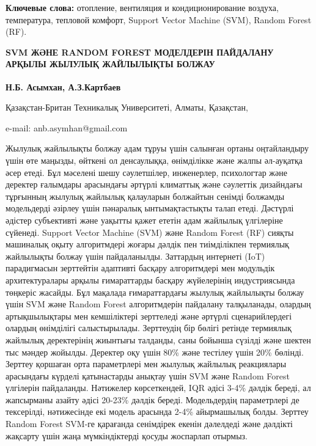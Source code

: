 {\bfseries Ключевые слова:} отопление, вентиляция и кондиционирование
воздуха, температура, тепловой комфорт, Support Vector Machine (SVM),
Random Forest (RF).

\begin{articleheader}
{\bfseries SVM ЖӘНЕ RANDOM FOREST МОДЕЛДЕРІН ПАЙДАЛАНУ АРҚЫЛЫ ЖЫЛУЛЫҚ ЖАЙЛЫЛЫҚТЫ БОЛЖАУ}

{\bfseries Н.Б. Асымхан\textsuperscript{\envelope }, А.З.Картбаев}
\end{articleheader}

\begin{affiliation}
Қазақстан-Британ Техникалық Университеті, Алматы, Қазақстан,

e-mail: anb.asymhan@gmail.com
\end{affiliation}

Жылулық жайлылықты болжау адам тұруы үшін салынған ортаны оңтайландыру
үшін өте маңызды, өйткені ол денсаулыққа, өнімділікке және жалпы
әл-ауқатқа әсер етеді. Бұл мәселені шешу сәулетшілер, инженерлер,
психологтар және деректер ғалымдары арасындағы әртүрлі климаттық және
сәулеттік дизайндағы тұрғынның жылулық жайлылық қалауларын болжайтын
сенімді болжамды модельдерді әзірлеу үшін пәнаралық ынтымақтастықты
талап етеді. Дәстүрлі әдістер субъективті және уақытты қажет ететін адам
жайлылық үлгілеріне сүйенеді. Support Vector Machine (SVM) және Random
Forest (RF) сияқты машиналық оқыту алгоритмдері жоғары дәлдік пен
тиімділікпен термиялық жайлылықты болжау үшін пайдаланылды. Заттардың
интернеті (IoT) парадигмасын зерттейтін адаптивті басқару алгоритмдері
мен модульдік архитектуралары арқылы ғимараттарды басқару жүйелерінің
индустриясында төңкеріс жасайды. Бұл мақалада ғимараттардағы жылулық
жайлылықты болжау үшін SVM және Random Forest алгоритмдерін пайдалану
талқыланады, олардың артықшылықтары мен кемшіліктері зерттеледі және
әртүрлі сценарийлердегі олардың өнімділігі салыстырылады. Зерттеудің бір
бөлігі ретінде термиялық жайлылық деректерінің жиынтығы талданды, саны
бойынша сүзілді және шектен тыс мәндер жойылды. Деректер оқу үшін 80\%
және тестілеу үшін 20\% бөлінді. Зерттеу қоршаған орта параметрлері мен
жылулық жайлылық реакциялары арасындағы күрделі қатынастарды анықтау
үшін SVM және Random Forest үлгілерін пайдаланды. Нәтижелер
көрсеткендей, IQR әдісі 3-4\% дәлдік береді, ал жапсырманы азайту әдісі
20-23\% дәлдік береді. Модельдердің параметрлері де тексерілді,
нәтижесінде екі модель арасында 2-4\% айырмашылық болды. Зерттеу Random
Forest SVM-ге қарағанда сенімдірек екенін дәлелдеді және дәлдікті
жақсарту үшін жаңа мүмкіндіктерді қосуды жоспарлап отырмыз.

